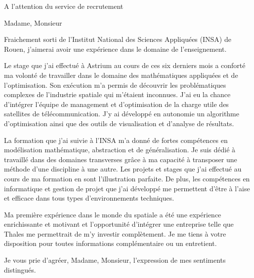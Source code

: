 \documentclass[12pt]{lettre}
\begin{document}
 
\begin{letter}{A l'attention du service de recrutement}
\address{Victor Cameo Ponz\\47 rue Guynemer\\31200 Toulouse}
\nofax

\opening{Madame, Monsieur}

Fraichement sorti de l'Institut National des Sciences Appliquées (INSA) de Rouen, j'aimerai avoir une expérience dans le domaine de l'enseignement.

Le stage que j'ai effectué à Astrium au cours de ces six derniers mois a conforté ma volonté de travailler dans le domaine des mathématiques appliquées et de l'optimisation. Son exécution m'a permis de découvrir les problématiques complexes de l'industrie spatiale qui m'étaient inconnues. J'ai eu la chance d'intégrer l'équipe de management et d'optimisation de la charge utile des satellites de télécommunication. J'y ai développé en autonomie un algorithme d'optimisation ainsi que des outils de visualisation et d'analyse de résultats.

La formation que j'ai suivie à l'INSA m'a donné de fortes compétences en modélisation mathématique, abstraction et de généralisation. Je suis dédié à travaillé dans des domaines transverses grâce à ma capacité à transposer une méthode d'une discipline à une autre. Les projets et stages que j'ai effectué au cours de ma formation en sont l'illustration parfaite. De plus, les compétences en informatique et gestion de projet que j'ai développé me permettent d'être à l'aise et efficace dans tous types d'environnements techniques.%

%
Ma première expérience dans le monde du spatiale a été une expérience enrichissante et motivant et l'opportunité d'intégrer une entreprise  telle que Thales me permettrait de m'y investir complètement.
%
Je me tiens à votre disposition pour toutes informations complémentaire ou un entretient.
\closing{Je vous prie d'agréer, Madame, Monsieur, l'expression de mes sentiments distingués.}
\end{letter}
 
\end{document}
